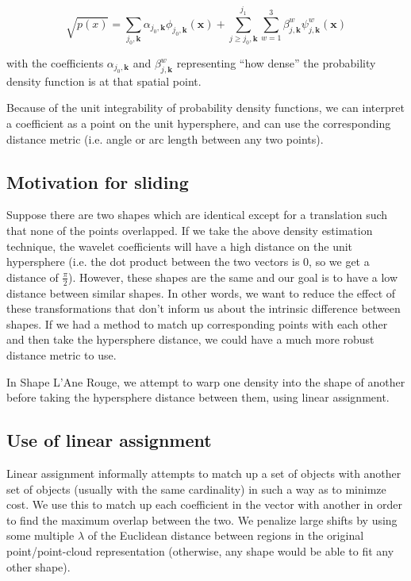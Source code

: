 \documentclass[../tech_report_1.tex]{subfiles}
\begin{document}
\begin{equation}
\sqrt{p(x)} = 
\sum_{j_0,\bm{k}}
	\alpha_{j_0,\bm{k}}
	\phi_{j_0,\bm{k}}(\bm{x})
+
\sum_{j\geq j_0, \bm{k}}^{j_1}
\sum_{w=1}^3
	\beta_{j,\bm{k}}^{w}
	\psi_{j,\bm{k}}^{w}(\bm{x})
\end{equation}

with the coefficients $\alpha_{j_0, \bm{k}}$ and $\beta_{j,\bm{k}}^w$ representing ``how dense'' the probability density function is at that spatial point.

Because of the unit integrability of probability density functions, we can interpret a coefficient as a point on the unit hypersphere, and can use the corresponding distance metric (i.e. angle or arc length between any two points).

\subsection*{Motivation for sliding}

Suppose there are two shapes which are identical except for a translation such that none of the points overlapped.
If we take the above density estimation technique, the wavelet coefficients will have a high distance on the unit hypersphere (i.e. the dot product between the two vectors is 0, so we get a distance of $\frac{\pi}{2}$).
However, these shapes are the same and our goal is to have a low distance between similar shapes. In other words, we want to reduce the effect of these transformations that don't inform us about the intrinsic difference between shapes. If we had a method to match up corresponding points with each other and then take the hypersphere distance, we could have a much more robust distance metric to use.

In Shape L'Ane Rouge, we attempt to warp one density into the shape of another before taking the hypersphere distance between them, using linear assignment.

\subsection*{Use of linear assignment}

Linear assignment informally attempts to match up a set of objects with another set of objects (usually with the same cardinality) in such a way as to minimze cost. We use this to match up each coefficient in the vector with another in order to find the maximum overlap between the two. We penalize large shifts by using some multiple $\lambda$ of the Euclidean distance between regions in the original point/point-cloud representation (otherwise, any shape would be able to fit any other shape).
\end{document}
